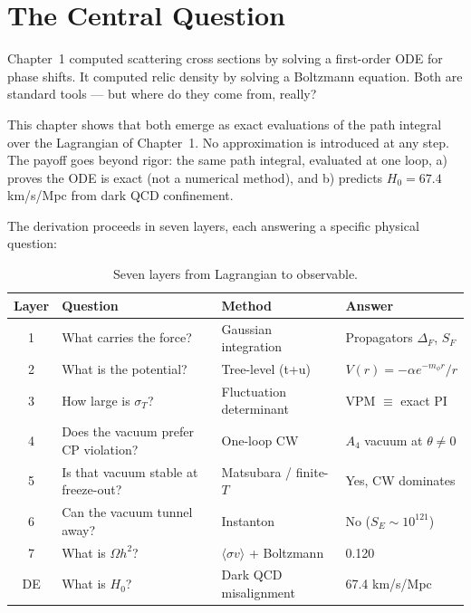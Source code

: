 
\section{The Central Question}
\label{ch2:question}

Chapter~1 computed scattering cross sections by solving a first-order ODE for
phase shifts. It computed relic density by solving a Boltzmann equation.
Both are standard tools — but where do they come from, really?

This chapter shows that both emerge as exact evaluations of the path integral
over the Lagrangian of Chapter~1. No approximation is introduced at any step.
The payoff goes beyond rigor: the same path integral, evaluated at one loop,
a) proves the ODE is exact (not a numerical method), and b) predicts $H_0 = 67.4$
km/s/Mpc from dark QCD confinement.

The derivation proceeds in seven layers, each answering a specific physical question:

\begin{table}[h!]
\centering
\caption{Seven layers from Lagrangian to observable.}
\begin{tabular}{clll}
\toprule
Layer & Question & Method & Answer \\
\midrule
1 & What carries the force? & Gaussian integration & Propagators $\Delta_F$, $S_F$ \\
2 & What is the potential? & Tree-level (t+u) & $V(r) = -\alpha e^{-m_\phi r}/r$ \\
3 & How large is $\sigma_T$? & Fluctuation determinant & VPM $\equiv$ exact PI \\
4 & Does the vacuum prefer CP violation? & One-loop CW & $A_4$ vacuum at $\theta \neq 0$ \\
5 & Is that vacuum stable at freeze-out? & Matsubara / finite-$T$ & Yes, CW dominates \\
6 & Can the vacuum tunnel away? & Instanton & No ($S_E \sim 10^{121}$) \\
7 & What is $\Omega h^2$? & $\langle\sigma v\rangle$ + Boltzmann & 0.120 \\
DE & What is $H_0$? & Dark QCD misalignment & 67.4 km/s/Mpc \\
\bottomrule
\end{tabular}
\end{table}

